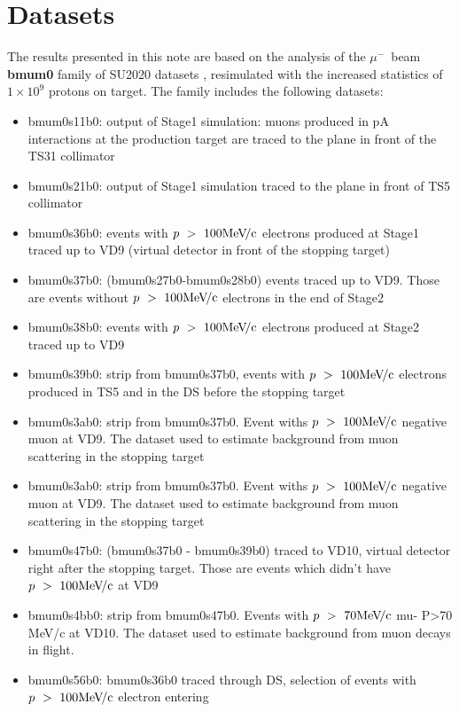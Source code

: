 \documentclass[12pt]{article}
\newcommand {\MeVc}       {\mbox{$\rm MeV\!/c$}}
\newcommand {\muminus}    {\mbox{$\mu^-$}}
\begin{document}
\section {Datasets}

The results presented in this note are based on the analysis of the \muminus\ beam {\bf bmum0}
family of SU2020 datasets \cite{SU2020_DATASETS}, resimulated with the increased statistics
of $1\times 10^9$ protons on target. The family includes the following datasets: 

\begin{itemize}
\item
  bmum0s11b0: output of Stage1 simulation: muons produced in pA interactions at the production target are
  traced to the plane in front of the TS31 collimator
\item
  bmum0s21b0: output of Stage1 simulation traced to the plane in front of TS5 collimator
\item
  bmum0s36b0: events with $p ~>~ 100 \MeVc$ electrons produced at Stage1 traced up to VD9
  (virtual detector in front of the stopping target)
\item
  bmum0s37b0: (bmum0s27b0-bmum0s28b0) events traced up to VD9.
  Those are events without $p ~>~ 100 \MeVc$ electrons in the end of Stage2
\item
  bmum0s38b0: events with $p ~>~ 100 \MeVc$ electrons produced at Stage2 traced up to VD9
\item
  bmum0s39b0: strip from bmum0s37b0, events with  $p ~>~ 100 \MeVc$ electrons produced in TS5 and
  in the DS before the stopping target
\item
  bmum0s3ab0: strip from bmum0s37b0. Event withs $p ~>~ 100 \MeVc$ negative muon at VD9.
  The dataset used to estimate background from muon scattering in the stopping target
\item
  bmum0s3ab0: strip from bmum0s37b0. Event withs $p ~>~ 100 \MeVc$ negative muon at VD9.
  The dataset used to estimate background from muon scattering in the stopping target
\item
  bmum0s47b0: (bmum0s37b0 - bmum0s39b0) traced to VD10, virtual detector right after the stopping target.
  Those are events which didn't have  $p ~>~ 100 \MeVc$ at VD9
\item
  bmum0s4bb0: strip from bmum0s47b0. Events with $p ~>~ 70 \MeVc$ mu- P>70 MeV/c at VD10.
  The dataset used to estimate background from muon decays in flight.
\item
  bmum0s56b0: bmum0s36b0 traced through DS, selection of events with $p ~>~ 100 \MeVc$ electron entering

\end{itemize}
\end{document}

